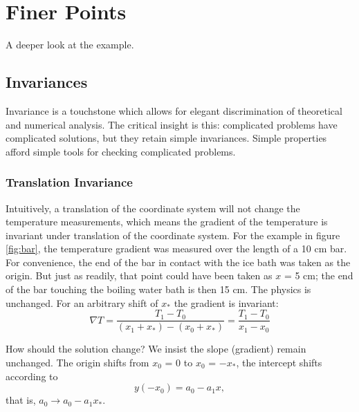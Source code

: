 \chapter{Finer Points}

A deeper look at the example.

\section{Invariances}  %
Invariance is a touchstone which allows for elegant discrimination of theoretical and numerical analysis. The critical insight is this: complicated problems have complicated solutions, but they retain simple invariances. Simple properties afford simple tools for checking complicated problems.

\subsection{\label{spec:translation invariance}Translation Invariance}  %
Intuitively, a translation of the coordinate system will not change the temperature measurements, which means the gradient of the temperature is invariant under translation of the coordinate system. For the example in figure \ref{fig:bar}, the temperature gradient was measured over the length of a 10 cm bar. For convenience, the end of the bar in contact with the ice bath was taken as the origin. But just as readily, that point could have been taken as $x$ = 5 cm; the end of the bar touching the boiling water bath is then 15 cm. The physics is unchanged. For an arbitrary shift of $x_{*}$ the gradient is invariant:
  \begin{equation*}   %
    \nabla T = \frac{T_{1} - T_{0}} { (x_{1} + x_{*}) - (x_{0} + x_{*}) }
             = \frac{T_{1} - T_{0}} { x_{1} - x_{0} }
  \end{equation*}

How should the solution change? We insist the slope (gradient) remain unchanged. The origin shifts from $x_{0}$ = 0 to $x_{0}$ = $-x_{*}$, the intercept shifts according to
  \begin{equation*}   %
      y(-x_{0}) = a_{0} - a_{1} x,
  \end{equation*}
that is, $a_{0} \to a_{0} - a_{1} x_{*}$.

